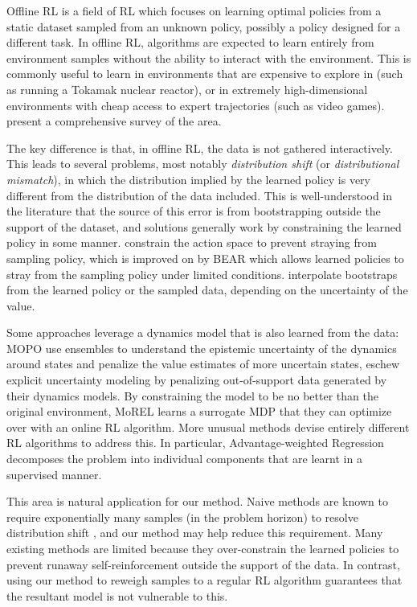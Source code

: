 \documentclass[11pt]{article}
\begin{document}
Offline RL is a field of RL which focuses on learning optimal policies from a static dataset sampled from an unknown policy, possibly a policy designed for a different task. In offline RL, algorithms are expected to learn entirely from environment samples without the ability to interact with the environment. This is commonly useful to learn in environments that are expensive to explore in (such as running a Tokamak nuclear reactor), or in extremely high-dimensional environments with cheap access to expert trajectories (such as video games). \citet{levine2020survey} present a comprehensive survey of the area.

The key difference is that, in offline RL, the data is not gathered interactively. This leads to several problems, most notably \emph{distribution shift} (or \emph{distributional mismatch}), in which the distribution implied by the learned policy is very different from the distribution of the data included. This is well-understood in the literature that the source of this error is from bootstrapping outside the support of the dataset, and solutions generally work by constraining the learned policy in some manner. \citet{fujimoto2019off} constrain the action space to prevent straying from sampling policy, which is improved on by BEAR \cite{kumar2019stabilizing} which allows learned policies to stray from the sampling policy under limited conditions. \citet{laroche2019safe} interpolate bootstraps from the learned policy or the sampled data, depending on the uncertainty of the value.

Some approaches leverage a dynamics model that is also learned from the data: MOPO \cite{yu2020mopo} use ensembles to understand the epistemic uncertainty of the dynamics around states and penalize the value estimates of more uncertain states, \cite{tianhe2021combo} eschew explicit uncertainty modeling by penalizing out-of-support data generated by their dynamics models. By constraining the model to be no better than the original environment, MoREL \cite{kidambi2020morel} learns a surrogate MDP that they can optimize over with an online RL algorithm. More unusual methods devise entirely different RL algorithms to address this. In particular, Advantage-weighted Regression \cite{peng2019advantage} decomposes the problem into individual components that are learnt in a supervised manner.

This area is natural application for our method. Naive methods are known to require exponentially many samples (in the problem horizon) to resolve distribution shift \cite{wang2020statistical}, and our method may help reduce this requirement. Many existing methods are limited because they over-constrain the learned policies to prevent runaway self-reinforcement outside the support of the data. In contrast, using our method to reweigh samples to a regular RL algorithm guarantees that the resultant model is not vulnerable to this.
\end{document}
